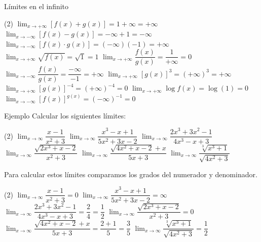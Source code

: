 \documentclass[8pt,handout]{beamer}
\newcommand{\limite}[2]{\displaystyle \lim_{x \rightarrow #1}{#2}}
\begin{document}
\begin{frame}{Límites en el infinito}
\begin{tasks}[label=\alph*)](2)
\task* $\limite{+\infty}{\left[ f(x)+g(x) \right] } = 1+\infty= +\infty$
\task* $\limite{-\infty}{\left[ f(x)-g(x) \right] } = -\infty+1=-\infty$
\task* $\limite{-\infty}{\left[ f(x)\cdot g(x) \right] }=(-\infty)(-1)=+\infty $
\task* $\limite{+\infty}{\sqrt{ f(x)} }= \sqrt{1}=1 $
\task $\limite{+\infty}{\dfrac{f(x)}{g(x)} }= \dfrac{1}{+\infty}=0$
\task $\limite{-\infty}{\dfrac{f(x)}{g(x)} }=\dfrac{-\infty}{-1}=+\infty$
\task $\limite{+\infty}{\left[ g(x) \right]^3 }= (+\infty)^3=+\infty$
\task $\limite{+\infty}{\left[ g(x) \right]^{-4} }=(+\infty)^{-4} = 0$
\task $\limite{+\infty}{\log f(x) }= \log(1)=0$
\task $\limite{-\infty}{\left[ f(x) \right]^{g(x)} } =(-\infty)^{-1}=0$
\end{tasks}

\end{frame}
\begin{frame}
\begin{exampleblock}{Ejemplo}
Calcular los siguientes límites:
\begin{tasks}[label=\alph*)](2)
\task $\limite{\infty}{\dfrac{x-1}{x^2+3} }$
\task $\limite{\infty}{\dfrac{x^3-x+1}{5x^2+3x-2} }$
\task $\limite{\infty}{\dfrac{2x^3+3x^2-1}{4x^3-x+3} }$
\task $\limite{\infty}{\dfrac{\sqrt{2x^3+x-2}}{x^2+3} }$
\task $\limite{\infty}{\dfrac{\sqrt{4x^2+x-2}+x}{5x+3} }$
\task $\limite{\infty}{\dfrac{\sqrt[3]{x^3+1}}{\sqrt{4x^2+3}} }$
\end{tasks}
\end{exampleblock}

Para calcular estos límites comparamos los grados del numerador y denominador.

\begin{tasks}[label=\alph*)](2)
\task $\limite{\infty}{\dfrac{x-1}{x^2+3} }= 0$
\task $\limite{\infty}{\dfrac{x^3-x+1}{5x^2+3x-2} }= \infty$
\task $\limite{\infty}{\dfrac{2x^3+3x^2-1}{4x^3-x+3} }= \dfrac{2}{4}=\dfrac{1}{2}$
\task $\limite{\infty}{\dfrac{\sqrt{2x^3+x-2}}{x^2+3} }= 0$
\task* $\limite{\infty}{\dfrac{\sqrt{4x^2+x-2}+x}{5x+3} }= \dfrac{2+1}{5}=\dfrac{3}{5}$
\task* $\limite{\infty}{\dfrac{\sqrt[3]{x^3+1}}{\sqrt{4x^2+3}} }= \dfrac{1}{2}$
\end{tasks}
\end{frame}
\end{document}
